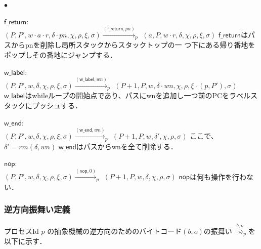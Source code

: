 \documentclass[submit,PRO]{ipsj}
\newcommand{\bcode}[1]{$\mathsf{#1}$}
\newcommand{\brightarrow}[1]{\stackrel{#1}{\rightsquigarrow}}
\begin{document}
\begin{list}{$\bullet$}{}
\item \bcode{f\_return}:\\
$(P,P',w\cdot a\cdot r,\delta\cdot pn,\chi,\rho,\xi,\sigma)\xrightarrow{(\mathsf{f\_return},pn)}_p$\newline
\qquad $(a,P,w\cdot r,\delta,\chi,\rho,\xi,\sigma)$\newline
\bcode{f\_return}はパスからpnを削除し局所スタックからスタックトップの一
      つ下にある帰り番地をポップしその番地にジャンプする．
\item \bcode{w\_label}:\\
$(P,P',w,\delta,\chi,\rho,\xi,\sigma)\xrightarrow{(\mathsf{w\_label},wn)}_p$\newline
\qquad $(P+1,P,w,\delta\cdot wn,\chi,\rho,\xi\cdot(p,P'),\sigma)$\newline
\bcode{w\_label}はwhileループの開始点であり、パスにwnを追加し一つ前のPCをラベルスタックにプッシュする．
\item \bcode{w\_end}:\\
$(P,P',w,\delta,\chi,\rho,\xi,\sigma)\xrightarrow{(\mathsf{w\_end},wn)}_p$\newline
\qquad $(P+1,P,w,\delta',\chi,\rho,\sigma)$\newline
ここで、$\delta'=rm(\delta,wn)$\newline
\bcode{w\_end}はパスからwnを全て削除する．
\item \bcode{nop}:\\
$(P,P',w,\delta,\chi,\rho,\xi,\sigma)\xrightarrow{(\mathsf{nop},0)}_p$\newline
\qquad $(P+1,P,w,\delta,\chi,\rho,\sigma)$\newline
\bcode{nop}は何も操作を行わない．
\end{list}

\subsubsection{逆方向振舞い定義}

プロセスId $p$ の抽象機械の逆方向のためのバイトコード$(b,o)$の振舞い
$\brightarrow{b,o}_{p}$を以下に示す．
\end{document}
